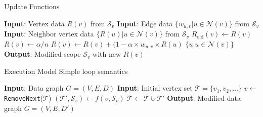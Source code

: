 \documentclass[onlymath,xcolor=pdftex,dvipsnames,table]{beamer}
\theoremstyle{remark} %
\begin{document}
\begin{frame}[fragile]{Update Functions}
\begin{example}[PageRank]
\begin{algorithm}[H]
  \caption{PageRank update function}\label{alg:pagerank}
  \begin{algorithmic}
    \State\textbf{Input}: Vertex data $R(v)$ from $\mathcal{S}_v$
    \State\textbf{Input}: Edge data $\{w_{u,v}|u\in\mathcal{N}(v)\}$ from $\mathcal{S}_v$
    \State\textbf{Input}: Neighbor vertex data $\{R(u)|u\in\mathcal{N}(v)\}$ from $\mathcal{S}_v$
    \State $R_{\text{old}}(v)\gets R(v)$ 
    \State $R(v)\gets\alpha/n$
     
      \State$R(v)\gets R(v)+(1-\alpha\times w_{u,v}\times R(u)$
    \EndFor
      \State\Return $\{u|u\in\mathcal{N}(v)\}$ 
    \EndIf
    \State\textbf{Output}: Modified scope $\mathcal{S}_v$ with new $R(v)$
  \end{algorithmic}
\end{algorithm}
\end{example}
\end{frame}

\begin{frame}[fragile]{Execution Model}
Simple loop semantics
\begin{algorithm}[H]
  \caption{GraphLab Execution Model}\label{alg:execution}
  \begin{algorithmic}
    \State\textbf{Input}: Data graph $G=(V,E,D)$
    \State\textbf{Input}: Initial vertex set $\mathcal{T}=\{v_1,v_2,\ldots\}$
      \State $v\gets $\texttt{RemoveNext}($\mathcal{T}$)
      \State $(\mathcal{T}',\mathcal{S}_v)\gets f(v,\mathcal{S}_v)$
      \State $\mathcal{T}\gets\mathcal{T}\cup\mathcal{T}'$ 
    \EndWhile
    \State\textbf{Output}: Modified data graph $G=(V,E,D')$
  \end{algorithmic}
\end{algorithm}
\end{frame}

\end{document}
